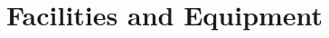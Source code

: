 \documentclass[fontsize=10pt,paper=letter,twoside=false,onecolumn]{scrartcl} %
\begin{document}
\section*{Facilities and Equipment}
\end{document}
